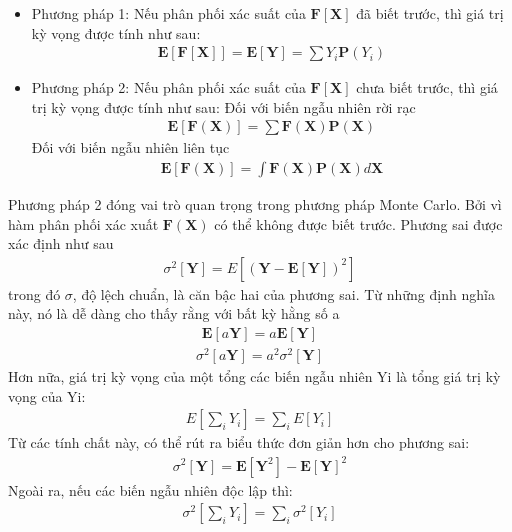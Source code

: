 \begin{itemize}
	\item Phương pháp 1: Nếu phân phối xác suất của $\textbf{F}[\textbf{X}]$ đã biết trước, thì giá trị kỳ vọng được tính như sau:
	\begin{align}
		\textbf{E}[\textbf{F}[\textbf{X}]]=\textbf{E}[\textbf{Y}]=\sum{Y_i\textbf{P}(Y_i)}
	\end{align}
	\item Phương pháp 2: Nếu phân phối xác suất của $\textbf{F}[\textbf{X}]$ chưa biết trước, thì giá trị kỳ vọng được tính như sau: 
	Đối với biến ngẫu nhiên rời rạc
	\begin{align}
		\textbf{E}[\textbf{F}(\textbf{X})]=\sum{\textbf{F}(\textbf{X})\textbf{P}(\textbf{X})}
	\end{align}
	Đối với biến ngẫu nhiên liên tục
	\begin{align}
		\textbf{E}[\textbf{F}(\textbf{X})]=\int{\textbf{F}(\textbf{X})\textbf{P}(\textbf{X})d\textbf{X}}
	\end{align}
\end{itemize}
Phương pháp 2 đóng vai trò quan trọng trong phương pháp Monte Carlo. 
Bởi vì hàm phân phối xác xuất $\textbf{F}(\textbf{X})$ có thể không được biết trước.
Phương sai được xác định như sau
\begin{align}
	\sigma^2[\textbf{Y}]=E[(\textbf{Y}-\textbf{E}[\textbf{Y}])^2]
\end{align}
trong đó $\sigma$, độ lệch chuẩn, là căn bậc hai của phương sai. 
Từ những định nghĩa này, nó là dễ dàng cho thấy rằng với bất kỳ hằng số a
\begin{align}
	\textbf{E}[a\textbf{Y}]=a\textbf{E}[\textbf{Y}]
\end{align}
\begin{align}
	\sigma^2[a\textbf{Y}]=a^2\sigma^2[\textbf{Y}]
\end{align}
Hơn nữa, giá trị kỳ vọng của một tổng các biến ngẫu nhiên Yi là tổng giá trị kỳ vọng của Yi:
\begin{align}
	E\left[\sum_i{Y_i}\right]=\sum_i{E[Y_i]}
\end{align}
Từ các tính chất này, có thể rút ra biểu thức đơn giản hơn cho phương sai:
\begin{align}
	\sigma^2[\textbf{Y}]=\textbf{E}[\textbf{Y}^2]-\textbf{E}[\textbf{Y}]^2
\end{align}
Ngoài ra, nếu các biến ngẫu nhiên độc lập thì:
\begin{align}
	\sigma^2\left[\sum_i{Y_i}\right]=\sum_i{\sigma^2[Y_i]}
\end{align}
